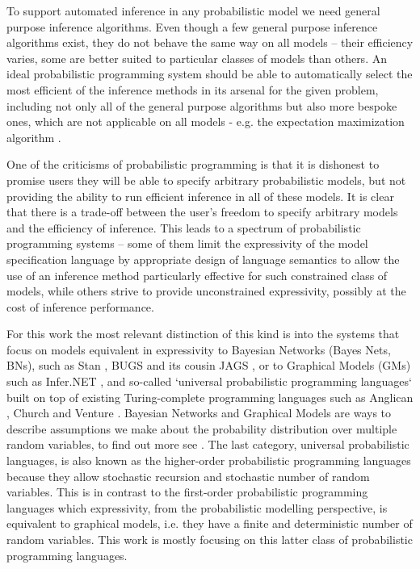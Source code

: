 \documentclass[12pt]{article}
\begin{document}
To support automated inference in any probabilistic model we need general purpose inference algorithms.
Even though a few general purpose inference algorithms exist, they do not behave the same way on all models -- their efficiency varies, some are better suited to particular classes of models than others.
An ideal probabilistic programming system should be able to automatically select the most efficient of the inference methods in its arsenal for the given problem, including not only all of the general purpose algorithms but also more bespoke ones, which are not applicable on all models - e.g. the expectation maximization algorithm \citep{EM}.

One of the criticisms of probabilistic programming is that it is dishonest to promise users they will be able to specify arbitrary probabilistic models, but not providing the ability to run efficient inference in all of these models.
It is clear that there is a trade-off between the user's freedom to specify arbitrary models and the efficiency of inference.
This leads to a spectrum of probabilistic programming systems -- some of them limit the expressivity of the model specification language by appropriate design of language semantics to allow the use of an inference method particularly effective for such constrained class of models, while others strive to provide unconstrained expressivity, possibly at the cost of inference performance.


For this work the most relevant distinction of this kind is into the systems that focus on models equivalent in expressivity to Bayesian Networks (Bayes Nets, BNs), such as Stan \citep{Stan}, BUGS \citep{WinBUGS,BUGSproject} and its cousin JAGS \citep{JAGS}, or to Graphical Models (GMs) such as Infer.NET \citep{InferNET}, and so-called `universal probabilistic programming languages` built on top of existing Turing-complete programming languages such as Anglican \citep{anglican}, Church \citep{GoodmanEtAl2008} and Venture \citep{venture}.
Bayesian Networks and Graphical Models are ways to describe assumptions we make about the probability distribution over multiple random variables, to find out more see \citep{KollerFriedman2009}.
The last category, universal probabilistic languages, is also known as the higher-order probabilistic programming languages because they allow stochastic recursion and stochastic number of random variables.
This is in contrast to the first-order probabilistic programming languages which expressivity, from the probabilistic modelling perspective, is equivalent to graphical models, i.e. they have a finite and deterministic number of random variables.
This work is mostly focusing on this latter class of probabilistic programming languages.
\end{document}
